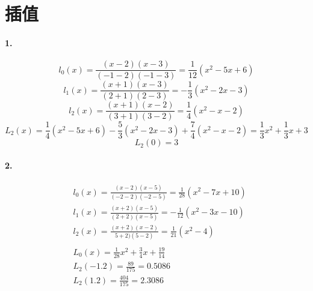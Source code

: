\documentclass[UTF8]{ctexart}
\begin{document}
	\section{插值}
	\paragraph{1.}
	\begin{displaymath}
		l_0(x)=\frac{(x-2)(x-3)}{(-1-2)(-1-3)}=\frac{1}{12}(x^{2}-5x+6)
	\end{displaymath}
	\begin{displaymath}
		l_1(x)=\frac{(x+1)(x-3)}{(2+1)(2-3)}=-\frac{1}{3}(x^{2}-2x-3)
	\end{displaymath}
	\begin{displaymath}
		l_2(x)=\frac{(x+1)(x-2)}{(3+1)(3-2)}=\frac{1}{4}(x^{2}-x-2)
	\end{displaymath}
	\begin{displaymath}
		L_2(x)=\frac{1}{4}(x^{2}-5x+6)-\frac{5}{3}(x^{2}-2x-3)+\frac{7}{4}(x^{2}-x-2)=\frac{1}{3}x^{2}+\frac{1}{3}x+3
	\end{displaymath}
	\begin{displaymath}
		L_2(0)=3 
	\end{displaymath}

	\paragraph{2.}
		\begin{displaymath}
		\begin{aligned}
			&l_0(x)=\frac{(x-2)(x-5)}{(-2-2)(-2-5)}=\frac{1}{28}(x^{2}-7x+10)\\ 
			&l_1(x)=\frac{(x+2)(x-5)}{(2+2)(x-5)}=-\frac{1}{12}(x^2-3x-10)\\
			&l_2(x)=\frac{(x+2)(x-2)}{5+2)(5-2)}=\frac{1}{21}(x^2-4)\\
			\\
			&L_0(x)=\frac{1}{28}x^2+\frac{3}{4}x+\frac{19}{14}\\
			&L_2(-1.2)=\frac{89}{175}=0.5086\\
			&L_2(1.2)=\frac{404}{175}=2.3086
		\end{aligned}
		\end{displaymath}
	
\end{document}
